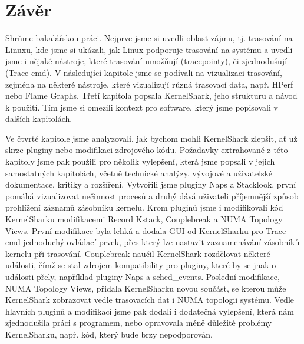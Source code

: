 \chapter*{Závěr}

Shrňme bakalářskou práci. Nejprve jsme si uvedli oblast zájmu, tj. trasování na Linuxu, kde jsme si ukázali, jak Linux podporuje trasování na systému a uvedli jsme i nějaké nástroje, které trasování umožňují (tracepointy), či zjednodušují (Trace-cmd). V následující kapitole jsme se podívali na vizualizaci trasování, zejména na některé nástroje, které vizualizují různá trasovací data, např. HPerf nebo Flame Graphs. Třetí kapitola popsala KernelShark, jeho strukturu a návod k použití. Tím jsme si omezili kontext pro software, který jsme popisovali v dalších kapitolách.

Ve čtvrté kapitole jsme analyzovali, jak bychom mohli KernelShark zlepšit, ať už skrze pluginy nebo modifikaci zdrojového kódu. Požadavky extrahované z této kapitoly jsme pak použili pro několik vylepšení, která jsme popsali v jejich samostatných kapitolách, včetně technické analýzy, vývojové a uživatelské dokumentace, kritiky a rozšíření. Vytvořili jsme pluginy Naps a Stacklook, první pomáhá vizualizovat nečinnost procesů a druhý dává uživateli příjemnější způsob prohlížení záznamů zásobníku kernelu. Krom pluginů jsme i modifikovali kód KernelSharku modifikacemi Record Kstack, Couplebreak a NUMA Topology Views. První modifikace byla lehká a dodala GUI od KernelSharku pro Trace-cmd jednoduchý ovládací prvek, přes který lze nastavit zaznamenávání zásobníků kernelu při trasování. Couplebreak naučil KernelShark rozdělovat některé události, čímž se stal zdrojem kompatibility pro pluginy, které by se jnak o události přely, například pluginy Naps a sched\_events. Poslední modifikace, NUMA Topology Views, přidala KernelSharku novou součást, se kterou může KernelShark zobrazovat vedle trasovacích dat i NUMA topologii systému. Vedle hlavních pluginů a modifikací jsme pak dodali i dodatečná vylepšení, která nám zjednodušila práci s programem, nebo opravovala méně důležité problémy KernelSharku, např. kód, který bude brzy nepodporován.